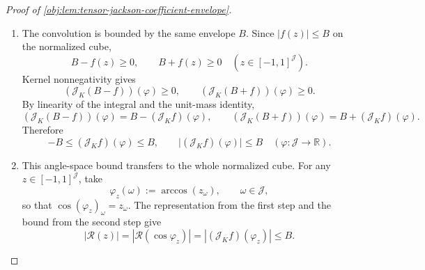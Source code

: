 \documentclass[11pt]{article}
\begin{document}
\begin{proof}[Proof of \cref{obj:lem:tensor-jackson-coefficient-envelope}]
\begin{enumerate}
\[\int_{\mathbb T_{\mathcal J}}
W_{\omega_0,\eta}(\psi)
\{\chi^{\cos}_{K,r}\sin(r\psi_{\omega_0})+\chi^{\sin}_{K,r}\cos(r\psi_{\omega_0})\}\,d\psi .
\]
Substituting the finite expansion of \(J_K(t-\psi_{\omega_0})\), using the angle-subtraction identities for sine and cosine, and integrating the finite sum term by term gives
\[
(\mathcal J_K f)(\eta_{\omega_0}\leftarrow t)
=
\sum_{r=0}^{N_K}
\{\Xi^{\cos}_{\omega_0,\eta,r}\cos(rt)+\Xi^{\sin}_{\omega_0,\eta,r}\sin(rt)\}.
\]
Thus each one-coordinate section is a trigonometric polynomial of frequency at most \(N_K\).  The same section is even in that coordinate: reflecting the integration variable \(\tau_{\omega_0}\mapsto-\tau_{\omega_0}\) preserves \(\mathbb T_{\mathcal J}\), the kernel is even, and cosine is even.  Therefore the sine part cancels.  Interpolating the resulting even trigonometric polynomial in one cosine coordinate at the nodes
\[
\xi_j=\frac{j}{N_K+1},\qquad
\zeta_j=\arccos(\xi_j),\qquad j=0,\ldots,N_K,
\]
and repeating this coordinate by coordinate gives a polynomial \(\mathcal R\) in the four variables such that
\[
\mathcal R(\cos\varphi)=(\mathcal J_K f)(\varphi)
\quad\text{for every }\varphi:\mathcal J\to\mathbb R.
\]
The interpolation basis has degree at most \(N_K\) in the coordinate being added, while the induction hypothesis controls the other coordinates.  Hence, for every
\(\beta\in\operatorname{supp}(\mathcal R)\),
\[
\beta_\omega\le N_K=2(K-1)
\quad\text{for every }\omega\in\mathcal J,
\]
and
\[
\deg(\mathcal R)\le 4N_K=8(K-1).
\]

\item
The convolution is bounded by the same envelope \(B\).  Since
\(\lvert f(z)\rvert\le B\) on the normalized cube,
\[
B-f(z)\ge0,
\qquad
B+f(z)\ge0
\quad
(z\in[-1,1]^{\mathcal J}).
\]
Kernel nonnegativity gives
\[
(\mathcal J_K(B-f))(\varphi)\ge0,
\qquad
(\mathcal J_K(B+f))(\varphi)\ge0 .
\]
By linearity of the integral and the unit-mass identity,
\[
(\mathcal J_K(B-f))(\varphi)
=
B-(\mathcal J_K f)(\varphi),
\qquad
(\mathcal J_K(B+f))(\varphi)
=
B+(\mathcal J_K f)(\varphi).
\]
Therefore
\[
-B\le(\mathcal J_K f)(\varphi)\le B,
\qquad
\lvert(\mathcal J_K f)(\varphi)\rvert\le B
\quad
(\varphi:\mathcal J\to\mathbb R).
\]

\item
This angle-space bound transfers to the whole normalized cube.  For any
\(z\in[-1,1]^{\mathcal J}\), take
\[
\varphi_z(\omega):=\arccos(z_\omega),
\qquad \omega\in\mathcal J,
\]
so that \(\cos(\varphi_z)_\omega=z_\omega\).  The representation from the first step and the bound from the second step give
\[
|\mathcal R(z)|
=
|\mathcal R(\cos\varphi_z)|
=
|(\mathcal J_K f)(\varphi_z)|
\le B .
\]


\end{enumerate}
\end{proof}
\end{document}
